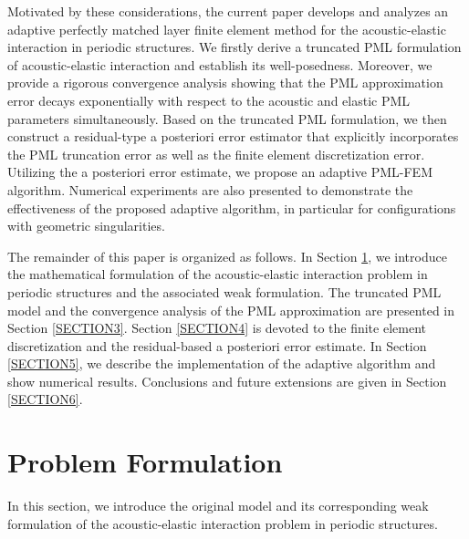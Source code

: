 \documentclass[final,3p,times]{elsarticle}
\begin{document}
Motivated by these considerations, the current paper develops and analyzes an adaptive perfectly matched layer finite element method for the acoustic-elastic interaction in periodic structures.  We firstly derive a truncated PML formulation of acoustic-elastic interaction and establish its well-posedness. Moreover, we provide a rigorous convergence analysis showing that the PML approximation error decays exponentially with respect to the acoustic and elastic PML parameters simultaneously. Based on the truncated PML formulation, we then construct a residual-type a posteriori error estimator that explicitly incorporates the PML truncation error as well as the finite element discretization error. Utilizing the a posteriori error estimate, we propose an adaptive PML-FEM algorithm. Numerical experiments are also presented to demonstrate the effectiveness of the proposed adaptive algorithm, in particular for configurations with geometric singularities.

The remainder of this paper is organized as follows. In Section \ref{SECTION2}, we introduce the mathematical formulation of the acoustic-elastic interaction problem in periodic structures and the associated weak formulation. The truncated PML model and the convergence analysis of the PML approximation are presented in Section \ref{SECTION3}. Section \ref{SECTION4} is devoted to the finite element discretization and the residual-based a posteriori error estimate. In Section \ref{SECTION5}, we describe the implementation of the adaptive algorithm and show numerical results. Conclusions and future extensions are given in Section \ref{SECTION6}.

\section{Problem Formulation}\label{SECTION2}
In this section, we introduce the original model and its corresponding weak formulation of the acoustic-elastic interaction problem in periodic structures.
\end{document}
